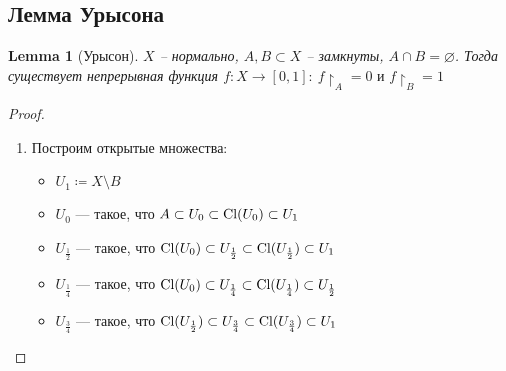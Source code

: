 \documentclass[11pt]{book}
\newcommand{\Cl}{{\mathop{\text{\rm Cl}}}}
\theoremstyle{definition}
\theoremstyle{plain}
\theoremstyle{plain}
\newtheorem*{lm}{Lemma}
\theoremstyle{definition}
\theoremstyle{remark}
\begin{document}
\subsection{Лемма Урысона}
\begin{lm}[Урысон]
    $ X$ -- нормально, $ A, B \subset  X$ -- замкнуты, $ A \cap  B = \varnothing$. Тогда существует непрерывная функция $ f: X \to  [0, 1]: ~ f\!\!\upharpoonright_A = 0 \text{ и } f\!\!\upharpoonright_B = 1$
\end{lm}
\begin{proof}
    $ $
    \begin{enumerate}[label=\roman*. ~]
        \item Построим открытые множества:
	    \begin{itemize}[label=$\blacktriangleright$ ]
		\item $ U_1 \coloneqq X \setminus B$
		\item $ U_0$ --- такое,  что $ A \subset U_0 \subset \Cl (U_0) \subset U_1$
		\item $ U_{\frac{1}{2}}$ --- такое, что $ \Cl(U_0) \subset U_{\frac{1}{2}} \subset \Cl (U_{\frac{1}{2}}) \subset U_1$ 
		\item $ U_{\frac{1}{4}} $ --- такое, что $ \Cl(U_0) \subset U_{\frac{1}{4}}\subset \Cl(U_{\frac{1}{4}}) \subset U_{\frac{1}{2}}$ 
		\item $ U_{\frac{3}{4}}$ --- такое, что $ \Cl(U_{\frac{1}{2}}) \subset U_{\frac{3}{4}}\subset \Cl(U_{\frac{3}{4}})\subset U_1$ 


\end{itemize}
\end{enumerate}
\end{proof}
\end{document}
